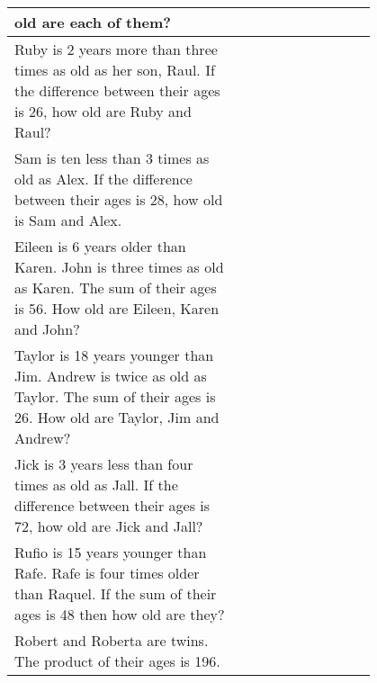 \begin{center}
\begin{longtable}{p{0.5\linewidth}>{\centering\arraybackslash$}p{0.3\linewidth}<{$}}
old are each of them? & \\ \hline
Ruby is 2 years more than three times as old as her son, Raul. If the difference between their ages is 26, how old are Ruby and Raul? & \\ \hline
Sam is ten less than 3 times as old as Alex. If the difference between their ages is 28, how old is Sam and Alex. & \\ \hline
Eileen is 6 years older than Karen. John is three times as old as Karen. The sum of their ages is 56. How old are Eileen, Karen and John? & \\ \hline
Taylor is 18 years younger than Jim. Andrew is twice as old as Taylor. The sum of their ages is 26. How old are Taylor, Jim and Andrew? & \\ \hline
Jick is 3 years less than four times as old as Jall. If the difference between their ages is 72, how old are Jick and Jall? & \\ \hline
Rufio is 15 years younger than Rafe. Rafe is four times older than Raquel. If the sum of their ages is 48 then how old are they? & \\ \hline
Robert and Roberta are twins. The product of their ages is 196. & \\ \hline
\hline
\end{longtable}
\end{center}